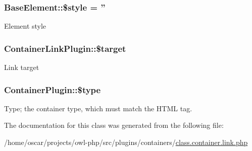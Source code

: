 \subsubsection[{\$style}]{\setlength{\rightskip}{0pt plus 5cm}BaseElement::\$style = ''}\label{classBaseElement_a429a3d642dd95f30e1059ef29564b87d}
Element style 
\subsubsection[{\$target}]{\setlength{\rightskip}{0pt plus 5cm}ContainerLinkPlugin::\$target}\label{classContainerLinkPlugin_acb0deabfd2fdcc6cdc076ff7cca8a7f5}
Link target 
\subsubsection[{\$type}]{\setlength{\rightskip}{0pt plus 5cm}ContainerPlugin::\$type}\label{classContainerPlugin_a4322b57179b2fb28ab6c9587e393842f}
Type; the container type, which must match the HTML tag. 

The documentation for this class was generated from the following file:\begin{DoxyCompactItemize}
\item 
/home/oscar/projects/owl-\/php/src/plugins/containers/\hyperlink{class_8container_8link_8php}{class.container.link.php}\end{DoxyCompactItemize}
